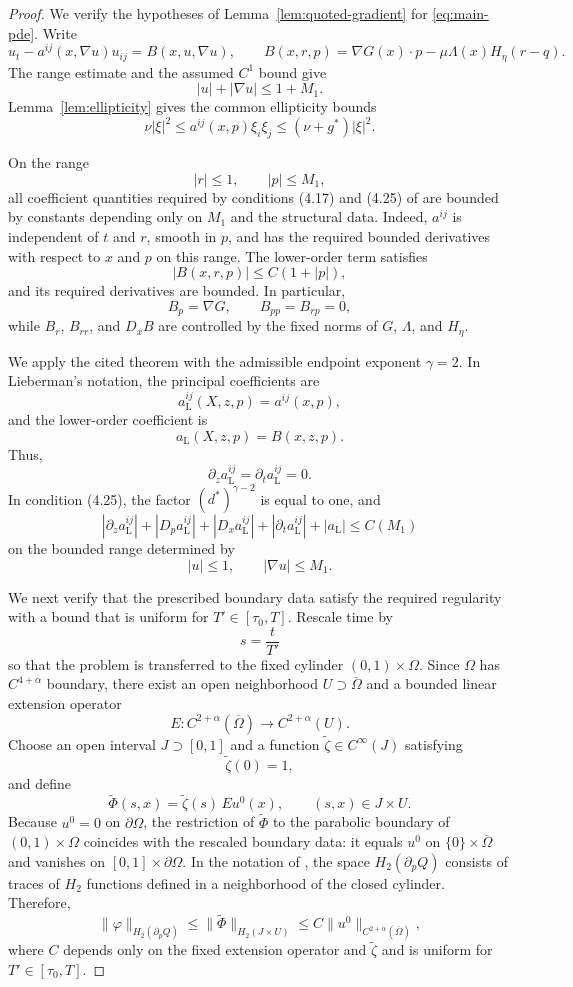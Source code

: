 \documentclass[11pt]{article}
\theoremstyle{remark}
\newcommand{\nupar}{\nu}
\begin{document}
\begin{proof}
We verify the hypotheses of Lemma~\ref{lem:quoted-gradient} for
\eqref{eq:main-pde}. Write
\[
u_t-a^{ij}(x,\nabla u)u_{ij}=B(x,u,\nabla u),
\qquad
B(x,r,p)=\nabla G(x)\cdot p-\mu\Lambda(x)H_\eta(r-q).
\]
The range estimate and the assumed $C^1$ bound give
\[
|u|+|\nabla u|\leq 1+M_1.
\]
Lemma~\ref{lem:ellipticity} gives the common ellipticity bounds
\[
\nupar|\xi|^2
\leq
a^{ij}(x,p)\xi_i\xi_j
\leq
(\nupar+g^*)|\xi|^2.
\]

On the range
\[
|r|\leq 1,
\qquad
|p|\leq M_1,
\]
all coefficient quantities required by conditions (4.17) and (4.25) of
\cite{Lieberman1986} are bounded by constants depending only on $M_1$
and the structural data. Indeed, $a^{ij}$ is independent of $t$ and $r$,
smooth in $p$, and has the required bounded derivatives with respect to
$x$ and $p$ on this range. The lower-order term satisfies
\[
|B(x,r,p)|\leq C(1+|p|),
\]
and its required derivatives are bounded. In particular,
\[
B_p=\nabla G,
\qquad
B_{pp}=B_{rp}=0,
\]
while $B_r$, $B_{rr}$, and $D_xB$ are controlled by the fixed norms of
$G$, $\Lambda$, and $H_\eta$.

We apply the cited theorem with the admissible endpoint exponent
$\gamma=2$. In Lieberman's notation, the principal coefficients are
\[
a_{\mathrm L}^{ij}(X,z,p)=a^{ij}(x,p),
\]
and the lower-order coefficient is
\[
a_{\mathrm L}(X,z,p)=B(x,z,p).
\]
Thus,
\[
\partial_z a_{\mathrm L}^{ij}
=
\partial_t a_{\mathrm L}^{ij}
=
0.
\]
In condition (4.25), the factor $(d^*)^{\gamma-2}$ is equal to one, and
\[
|\partial_z a_{\mathrm L}^{ij}|
+
|D_pa_{\mathrm L}^{ij}|
+
|D_xa_{\mathrm L}^{ij}|
+
|\partial_ta_{\mathrm L}^{ij}|
+
|a_{\mathrm L}|
\leq C(M_1)
\]
on the bounded range determined by
\[
|u|\leq 1,
\qquad
|\nabla u|\leq M_1.
\]

We next verify that the prescribed boundary data satisfy the required
regularity with a bound that is uniform for $T'\in[\tau_0,T]$. Rescale
time by
\[
s=\frac{t}{T'}
\]
so that the problem is transferred to the fixed cylinder
$(0,1)\times\Omega$. Since $\Omega$ has $C^{4+\alpha}$ boundary, there
exist an open neighborhood $U\supset\overline{\Omega}$ and a bounded
linear extension operator
\[
E:
C^{2+\alpha}(\overline{\Omega})
\longrightarrow
C^{2+\alpha}(U).
\]
Choose an open interval $J\supset[0,1]$ and a function
$\widetilde{\zeta}\in C^\infty(J)$ satisfying
\[
\widetilde{\zeta}(0)=1,
\]
and define
\[
\widetilde{\Phi}(s,x)
=
\widetilde{\zeta}(s)\,Eu^0(x),
\qquad
(s,x)\in J\times U.
\]
Because $u^0=0$ on $\partial\Omega$, the restriction of
$\widetilde{\Phi}$ to the parabolic boundary of
$(0,1)\times\Omega$ coincides with the rescaled boundary data: it equals
$u^0$ on $\{0\}\times\overline{\Omega}$ and vanishes on
$[0,1]\times\partial\Omega$. In the notation of
\cite[p.~350]{Lieberman1986}, the space $H_2(\partial_pQ)$ consists of
traces of $H_2$ functions defined in a neighborhood of the closed
cylinder. Therefore,
\[
\|\varphi\|_{H_2(\partial_pQ)}
\leq
\|\widetilde{\Phi}\|_{H_2(J\times U)}
\leq
C\|u^0\|_{C^{2+\alpha}(\overline{\Omega})},
\]
where $C$ depends only on the fixed extension operator and
$\widetilde{\zeta}$ and is uniform for $T'\in[\tau_0,T]$.


\end{proof}
\end{document}
